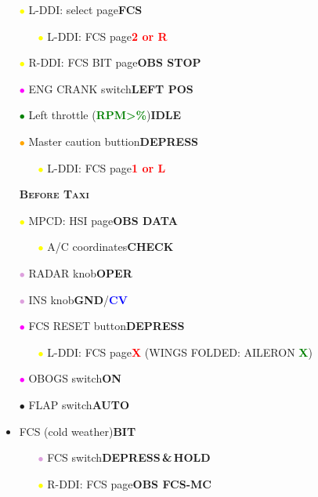 \documentclass[a4paper,12pt,dvipsnames]{letter}
\newcommand{\button}[1]{\textbf{#1}}
\newcommand{\ok}[1]{\textcolor{Green}{\textbf{#1}}}
\newcommand{\boat}[1]{\textcolor{Blue}{\textbf{#1}}}
\newcommand{\warn}[1]{\textcolor{Red}{\textbf{#1}}}
\newcommand{\myHead}[1]{{\LARGE\textsc{\textbf{#1}}}}
\newcommand{\bi}{\textcolor{ProcessBlue}{$\bullet$\;}}
\newcommand{\gi}{\textcolor{Green}{$\bullet$\;}}
\newcommand{\yi}{\textcolor{Yellow}{$\bullet$\;}}
\newcommand{\vi}{\textcolor{Plum}{$\bullet$\;}}
\newcommand{\mi}{\textcolor{Magenta}{$\bullet$\;}}
\newcommand{\oi}{\textcolor{Orange}{$\bullet$\;}}
\begin{document}
{\begin{itemize}
 \item[\yi] L-DDI: select page\dotfill\button{FCS}
 \begin{itemize}
  \item[\yi] L-DDI: FCS page\dotfill\warn{2 or R}
 \end{itemize}
 \item[\yi] R-DDI: FCS BIT page\dotfill\button{OBS STOP}
 \item[\mi] ENG CRANK switch\dotfill\button{LEFT POS}
 \item[\gi] Left throttle (\ok{RPM\;>\%})\dotfill\button{IDLE}
 \item[\oi] Master caution buttion\dotfill\button{DEPRESS}
 \begin{itemize}
  \item[\yi] L-DDI: FCS page\dotfill\warn{1 or L}
 \end{itemize} 
\end{itemize}
\vspace{0.5em}
\begin{itemize}
 \item[] \myHead{Before Taxi}
 \item[\yi] MPCD: HSI page\dotfill\button{OBS DATA}
 \begin{itemize}
  \item[\yi] A/C coordinates\dotfill\button{CHECK}
 \end{itemize} 
 \item[\vi] RADAR knob\dotfill\button{OPER}
 \item[\vi] INS knob\dotfill\button{GND}/\boat{CV}
 \item[\mi] FCS RESET button\dotfill\button{DEPRESS}
 \begin{itemize}
  \item[\yi] L-DDI: FCS page\dotfill\warn{X} (WINGS FOLDED: AILERON \ok{X})
 \end{itemize}
 \item[\mi] OBOGS switch\dotfill\button{ON}
 \item[\bi] FLAP switch\dotfill\button{AUTO}
 \item FCS (cold weather)\dotfill\button{BIT}
 \begin{itemize}
  \item[\vi] FCS switch\dotfill\button{DEPRESS\,\&\,HOLD}
  \item[\yi] R-DDI: FCS page\dotfill\button{OBS FCS-MC}

\end{itemize}
\end{itemize}}
\end{document}
